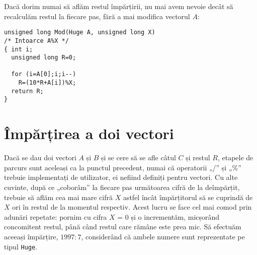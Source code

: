Dacă dorim numai să aflăm restul împărțirii, nu mai avem nevoie decât să
recalculăm restul la fiecare pas, fără a mai modifica vectorul $A$:

\begin{verbatim}
unsigned long Mod(Huge A, unsigned long X)
/* Intoarce A%X */
{ int i;
  unsigned long R=0;

  for (i=A[0];i;i--)
    R=(10*R+A[i])%X;
  return R;
}
\end{verbatim}

\section{Împărțirea a doi vectori}

Dacă se dau doi vectori $A$ și $B$ și se cere să se afle câtul $C$ și restul
$R$, etapele de parcurs sunt aceleași ca la punctul precedent, numai că
operatorii „/” și „\%” trebuie implementați de utilizator, ei nefiind definiți
pentru vectori. Cu alte cuvinte, după ce „coborâm” la fiecare pas următoarea
cifră de la deîmpărțit, trebuie să aflăm cea mai mare cifră $X$ astfel încât
împărțitorul să se cuprindă de $X$ ori în restul de la momentul
respectiv. Acest lucru se face cel mai comod prin adunări repetate: pornim cu
cifra $X$ = 0 și o incrementăm, micșorând concomitent restul, până când restul
care rămâne este prea mic. Să efectuăm aceeași împărțire, $1997:7$, considerând
că ambele numere sunt reprezentate pe tipul {\tt Huge}.

